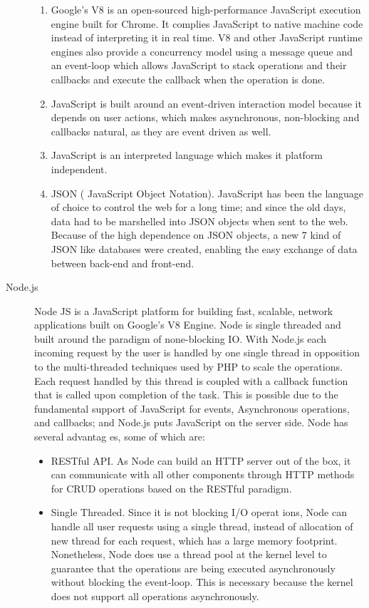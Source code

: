 \begin{description}
\begin{enumerate}
        \item Google’s V8 is an open-sourced high-performance JavaScript execution engine built for Chrome. It complies JavaScript to native machine code instead of interpreting it in real time. V8 and other JavaScript runtime engines also provide a concurrency model using a message queue and an event-loop which allows JavaScript to stack operations and their callbacks and execute the callback when the operation is done.
        \item JavaScript is built around an event-driven interaction model because it depends on user actions, which makes asynchronous, non-blocking and callbacks natural, as they are event driven as well.
        \item JavaScript is an interpreted language which makes it platform independent.
        \item JSON (
        JavaScript Object Notation). JavaScript has been the language of choice to control the web for a long time; and since the old days, data had to be marshelled into JSON
        objects when sent to the web. Because of the high dependence on JSON objects, a new 7 kind of JSON like databases were created, enabling the easy exchange of data between back-end and front-end.
    \end{enumerate}
    \item[Node.js] Node JS is a JavaScript platform for building fast, scalable, network applications built on
    Google’s V8 Engine. Node is single threaded and built around the paradigm of none-blocking IO. With Node.js each incoming request by the user is handled by one single thread in opposition to the multi-threaded techniques used by PHP to scale the operations. Each request handled by
    this thread is coupled with a callback function that is called upon completion of the task. This is possible due to the fundamental support of JavaScript for events, Asynchronous operations, and callbacks; and Node.js puts JavaScript on the server side. Node has several advantag
    es, some of which are:
    \begin{itemize}
        \item RESTful API. As Node can build an HTTP server out of the box, it can communicate with all other components through HTTP methods for CRUD operations based on the
        RESTful paradigm.
        \item Single Threaded. Since it is not blocking I/O operat
        ions, Node can handle all user requests using a single thread, instead of allocation of new thread for each request, which has a large memory footprint. Nonetheless, Node does use a thread pool at the kernel level to guarantee that the operations are being executed asynchronously without blocking the event-loop. This is necessary because the kernel does not support all operations asynchronously.

\end{itemize}
\end{description}
